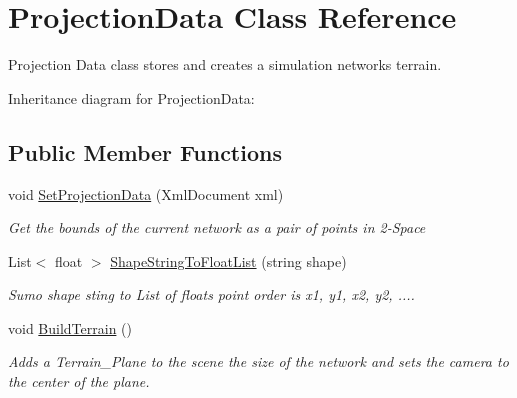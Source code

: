 \hypertarget{class_projection_data}{}\section{Projection\+Data Class Reference}
\label{class_projection_data}


Projection Data class stores and creates a simulation networks terrain.  


Inheritance diagram for Projection\+Data\+:\begin{figure}[H]
\begin{center}
\leavevmode
\end{center}
\end{figure}
\subsection*{Public Member Functions}
\begin{DoxyCompactItemize}
\item 
void \mbox{\hyperlink{class_projection_data_aa1a7f30d0e2d0dd4a964581d6307e3bb}{Set\+Projection\+Data}} (Xml\+Document xml)
\begin{DoxyCompactList}\small\item\em Get the bounds of the current network as a pair of points in 2-\/Space \end{DoxyCompactList}\item 
List$<$ float $>$ \mbox{\hyperlink{class_projection_data_a9ff12ad53d0ef919479b5cc7168ac59c}{Shape\+String\+To\+Float\+List}} (string shape)
\begin{DoxyCompactList}\small\item\em Sumo shape sting to List of floats point order is x1, y1, x2, y2, .... \end{DoxyCompactList}\item 
void \mbox{\hyperlink{class_projection_data_a7e00204c97b5c3c3e603e2ab55b4793a}{Build\+Terrain}} ()
\begin{DoxyCompactList}\small\item\em Adds a Terrain\+\_\+\+Plane to the scene the size of the network and sets the camera to the center of the plane. \end{DoxyCompactList}\end{DoxyCompactItemize}
